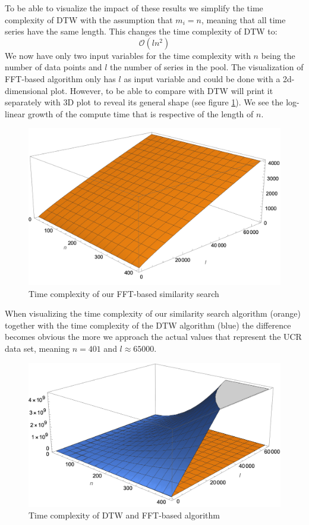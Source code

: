 \documentclass[phd,black, hidelinks]{PrincetonThesis}
\begin{document}
To be able to visualize the impact of these results we simplify the time complexity of DTW with the assumption that \(m_i = n\), meaning that all time series have the same length. This changes the time complexity of DTW to:
\begin{equation}
\mathcal{O}(l n^2)
\end{equation}
We now have only two input variables for the time complexity with \(n\) being the number of data points and \(l\) the number of series in the pool. The visualization of FFT-based algorithm only has \(l\) as input variable and could be done with a 2d-dimensional plot. However, to be able to compare with DTW will print it separately with 3D plot to reveal its general shape (see figure \ref{fig:orga1fc5ee}). We see the log-linear growth of the compute time that is respective of the length of \(n\).

\begin{figure}[htbp]
\centering
\includegraphics[width=.9\linewidth]{./img/tc_fft.png}
\caption{\label{fig:orga1fc5ee}Time complexity of our FFT-based similarity search}
\end{figure}

When visualizing the time complexity of our similarity search algorithm (orange) together with the time complexity of the DTW algorithm (blue) the difference becomes obvious the more we approach the actual values that represent the UCR data set, meaning \(n = 401\) and \(l \approx 65000\).
\begin{figure}[htbp]
\centering
\includegraphics[width=.9\linewidth]{./img/tc_dtw_fft.png}
\caption{\label{fig:org9b562ea}Time complexity of DTW and FFT-based algorithm}
\end{figure}
\end{document}
